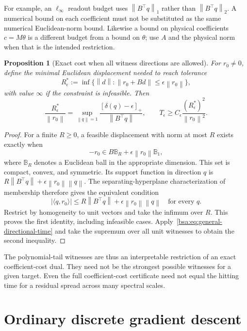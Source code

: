 \documentclass[11pt,letterpaper]{article}
\newcommand{\bsaNorm}[1]{\left\lVert #1\right\rVert}
\newcommand{\bsaPos}[1]{\left[#1\right]_+}
\newtheorem{bsaProposition}{Proposition}[section]
\theoremstyle{remark}
\theoremstyle{plain}
\begin{document}
For example, an $\ell_\infty$ readout budget uses $\bsaNorm{B^\top q}_{1}$ rather than $\bsaNorm{B^\top q}_{2}$. A numerical bound on each coefficient must not be substituted as the same numerical Euclidean-norm bound. Likewise a bound on physical coefficients $c=M\theta$ is a different budget from a bound on $\theta$; use $A$ and the physical norm when that is the intended restriction.

\begin{bsaProposition}[Exact cost when all witness directions are allowed]
\label{bsa:prop:dual-radius}
For $r_0\ne0$, define the minimal Euclidean displacement needed to reach tolerance
\[
 R_\epsilon^*:=\inf\{\bsaNorm d:\bsaNorm{r_0+Bd}\le\epsilon\bsaNorm{r_0}\},
\]
with value $\infty$ if the constraint is infeasible. Then
\begin{equation}
 \frac{R_\epsilon^*}{\bsaNorm{r_0}}
 =\sup_{\bsaNorm q=1}
 \frac{\bsaPos{\delta(q)-\epsilon}}{\bsaNorm{B^\top q}},
 \qquad
 T_\epsilon\ge C_\epsilon\frac{(R_\epsilon^*)^2}{\bsaNorm{r_0}^2}.
 \label{bsa:eq:dual-radius}
\end{equation}
\end{bsaProposition}
\begin{proof}
For a finite $R\ge0$, a feasible displacement with norm at most $R$ exists exactly when
\[
 -r_0\in B\mathbb B_R+\epsilon\bsaNorm{r_0}\mathbb B_1,
\]
where $\mathbb B_R$ denotes a Euclidean ball in the appropriate dimension. This set is compact, convex, and symmetric. Its support function in direction $q$ is
$R\bsaNorm{B^\top q}+\epsilon\bsaNorm{r_0}\bsaNorm q$.
The separating-hyperplane characterization of membership therefore gives the equivalent condition
\[
 |\langle q,r_0\rangle|
 \le R\bsaNorm{B^\top q}+\epsilon\bsaNorm{r_0}\bsaNorm q
 \quad\text{for every }q.
\]
Restrict by homogeneity to unit vectors and take the infimum over $R$. This proves the first identity, including infeasible cases. Apply~\eqref{bsa:eq:general-directional-time} and take the supremum over all unit witnesses to obtain the second inequality.
\end{proof}

The polynomial-tail witnesses are thus an interpretable restriction of an exact coefficient-cost dual. They need not be the strongest possible witnesses for a given target. Even the full coefficient-cost certificate need not equal the hitting time for a residual spread across many spectral scales.

\section{Ordinary discrete gradient descent}
\label{bsa:sec:gd}
\end{document}
